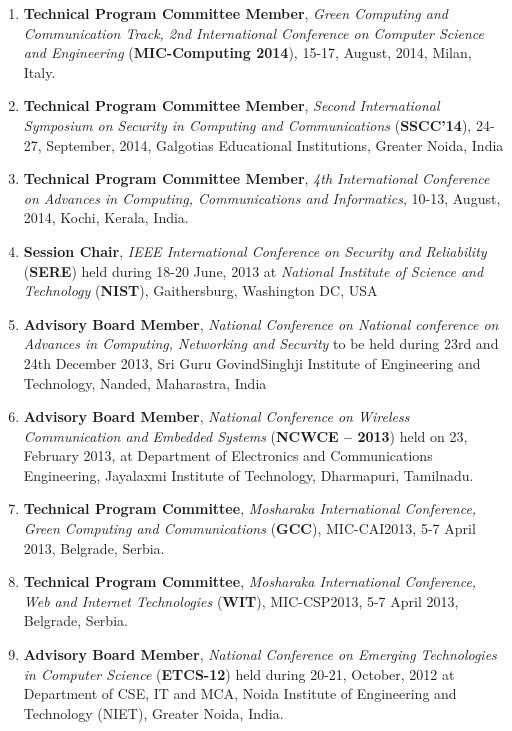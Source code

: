\begin{enumerate}
\item
\textbf{Technical Program Committee Member}, \textit{Green Computing and Communication Track, 2nd International Conference on Computer Science and Engineering} (\textbf{MIC-Computing 2014}), 15-17, August, 2014, Milan, Italy.

\item
\textbf{Technical Program Committee Member},\textit{ Second International Symposium on Security in Computing and Communications} (\textbf{SSCC’14}), 24-27, September, 2014, Galgotias Educational Institutions, Greater Noida, India

\item
\textbf{Technical Program Committee Member}, \textit{4th International Conference on Advances in Computing, Communications and Informatics}, 10-13, August, 2014, Kochi, Kerala, India.

\item
\textbf{Session Chair}, \textit{IEEE International Conference on Security and Reliability} (\textbf{SERE}) held during 18-20 June, 2013 at\textit{ National Institute of Science and Technology} (\textbf{NIST}), Gaithersburg, Washington DC, USA

\item
\textbf{Advisory Board Member}, \textit{National Conference on National conference on Advances in Computing, Networking and Security} to be held during 23rd and 24th December 2013, Sri Guru GovindSinghji Institute of Engineering and Technology, Nanded, Maharastra, India

\item
\textbf{Advisory Board Member}, \textit{National Conference on Wireless Communication and Embedded Systems} (\textbf{NCWCE – 2013}) held on 23, February 2013, at Department of Electronics and Communications Engineering, Jayalaxmi Institute of Technology, Dharmapuri, Tamilnadu. 

\item
\textbf{Technical Program Committee}, \textit{Mosharaka International Conference, Green Computing and Communications} (\textbf{GCC}), MIC-CAI2013, 5-7 April 2013, Belgrade, Serbia.

\item
\textbf{Technical Program Committee}, \textit{Mosharaka International Conference, Web and Internet Technologies} (\textbf{WIT}), MIC-CSP2013, 5-7 April 2013, Belgrade, Serbia.

\item
\textbf{Advisory Board Member}, \textit{National Conference on Emerging Technologies in Computer Science}  (\textbf{ETCS-12})  held during 20-21, October, 2012 at Department of CSE, IT and MCA, Noida Institute of Engineering and Technology (NIET), Greater Noida, India.


\end{enumerate}
